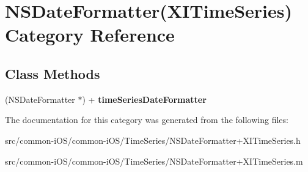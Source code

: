 \hypertarget{category_n_s_date_formatter_07_x_i_time_series_08}{}\section{N\+S\+Date\+Formatter(X\+I\+Time\+Series) Category Reference}
\label{category_n_s_date_formatter_07_x_i_time_series_08}
\subsection*{Class Methods}
\begin{DoxyCompactItemize}
\item 
\hypertarget{category_n_s_date_formatter_07_x_i_time_series_08_ab37b07c7a4d52c8bdd7db69f752c1a1f}{}\label{category_n_s_date_formatter_07_x_i_time_series_08_ab37b07c7a4d52c8bdd7db69f752c1a1f} 
(N\+S\+Date\+Formatter $\ast$) + {\bfseries time\+Series\+Date\+Formatter}
\end{DoxyCompactItemize}


The documentation for this category was generated from the following files\+:\begin{DoxyCompactItemize}
\item 
src/common-\/i\+O\+S/common-\/i\+O\+S/\+Time\+Series/N\+S\+Date\+Formatter+\+X\+I\+Time\+Series.\+h\item 
src/common-\/i\+O\+S/common-\/i\+O\+S/\+Time\+Series/N\+S\+Date\+Formatter+\+X\+I\+Time\+Series.\+m\end{DoxyCompactItemize}
